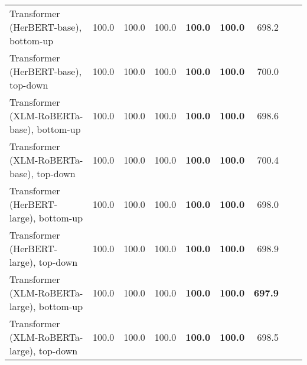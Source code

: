 \begin{table}[ht!]
{\begin{tabular}{lrrrrrrrr}
  Transformer (HerBERT-base), bottom-up & 100.0 & 100.0 & 100.0 & \textbf{100.0} & \textbf{100.0} & 698.2 \\ 
  Transformer (HerBERT-base), top-down & 100.0 & 100.0 & 100.0 & \textbf{100.0} & \textbf{100.0} & 700.0 \\ 
  Transformer (XLM-RoBERTa-base), bottom-up & 100.0 & 100.0 & 100.0 & \textbf{100.0} & \textbf{100.0} & 698.6 \\ 
  Transformer (XLM-RoBERTa-base), top-down & 100.0 & 100.0 & 100.0 & \textbf{100.0} & \textbf{100.0} & 700.4 \\ 
  Transformer (HerBERT-large), bottom-up & 100.0 & 100.0 & 100.0 & \textbf{100.0} & \textbf{100.0} & 698.0 \\ 
  Transformer (HerBERT-large), top-down & 100.0 & 100.0 & 100.0 & \textbf{100.0} & \textbf{100.0} & 698.9 \\ 
  Transformer (XLM-RoBERTa-large), bottom-up & 100.0 & 100.0 & 100.0 & \textbf{100.0} & \textbf{100.0} & \textbf{697.9} \\ 
  Transformer (XLM-RoBERTa-large), top-down & 100.0 & 100.0 & 100.0 & \textbf{100.0} & \textbf{100.0} & 698.5 \\ 
   \hline
\end{tabular}
}
\end{table}




